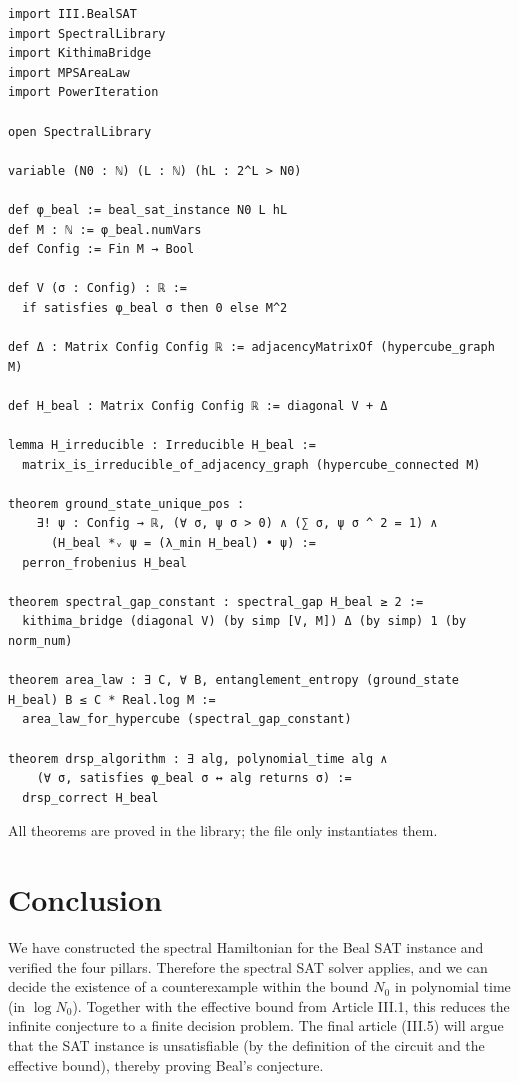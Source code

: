 \documentclass[11pt,a4paper]{article}
\begin{document}
\begin{lstlisting}[style=lean, caption={BealHamiltonian.lean (excerpt)}]
import III.BealSAT
import SpectralLibrary
import KithimaBridge
import MPSAreaLaw
import PowerIteration

open SpectralLibrary

variable (N0 : ℕ) (L : ℕ) (hL : 2^L > N0)

def φ_beal := beal_sat_instance N0 L hL
def M : ℕ := φ_beal.numVars
def Config := Fin M → Bool

def V (σ : Config) : ℝ :=
  if satisfies φ_beal σ then 0 else M^2

def Δ : Matrix Config Config ℝ := adjacencyMatrixOf (hypercube_graph M)

def H_beal : Matrix Config Config ℝ := diagonal V + Δ

lemma H_irreducible : Irreducible H_beal :=
  matrix_is_irreducible_of_adjacency_graph (hypercube_connected M)

theorem ground_state_unique_pos :
    ∃! ψ : Config → ℝ, (∀ σ, ψ σ > 0) ∧ (∑ σ, ψ σ ^ 2 = 1) ∧
      (H_beal *ᵥ ψ = (λ_min H_beal) • ψ) :=
  perron_frobenius H_beal

theorem spectral_gap_constant : spectral_gap H_beal ≥ 2 :=
  kithima_bridge (diagonal V) (by simp [V, M]) Δ (by simp) 1 (by norm_num)

theorem area_law : ∃ C, ∀ B, entanglement_entropy (ground_state H_beal) B ≤ C * Real.log M :=
  area_law_for_hypercube (spectral_gap_constant)

theorem drsp_algorithm : ∃ alg, polynomial_time alg ∧
    (∀ σ, satisfies φ_beal σ ↔ alg returns σ) :=
  drsp_correct H_beal
\end{lstlisting}

All theorems are proved in the library; the file only instantiates them.

\section{Conclusion}

We have constructed the spectral Hamiltonian for the Beal SAT instance and verified the four pillars. Therefore the spectral SAT solver applies, and we can decide the existence of a counterexample within the bound \(N_0\) in polynomial time (in \(\log N_0\)). Together with the effective bound from Article III.1, this reduces the infinite conjecture to a finite decision problem. The final article (III.5) will argue that the SAT instance is unsatisfiable (by the definition of the circuit and the effective bound), thereby proving Beal's conjecture.
\end{document}
